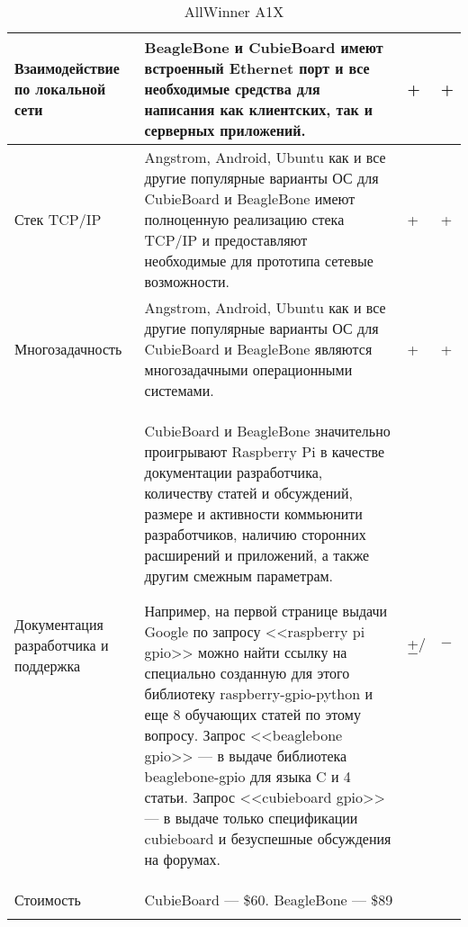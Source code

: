 \documentclass[twoside,a4paper]{msmb} %
\begin{document}
\begin{longtable}{| p{} | p{} | p{1cm} | p{1cm} |}
\hline
Взаимодействие по локальной сети &

BeagleBone и CubieBoard имеют встроенный Ethernet порт и все необходимые средства для написания как клиентских, так и серверных приложений.&

+ &

+\\

\hline
Стек TCP/IP &

Angstrom, Android, Ubuntu как и все другие популярные варианты ОС для CubieBoard и BeagleBone имеют полноценную реализацию стека TCP/IP и предоставляют необходимые для прототипа сетевые возможности. &

+ &

+\\

\hline
Многозадачность &

Angstrom, Android, Ubuntu как и все другие популярные варианты ОС для CubieBoard и BeagleBone являются многозадачными операционными системами. &

+ &

+\\

\hline 
Документация разработчика и поддержка & 

CubieBoard и BeagleBone значительно проигрывают Raspberry Pi в качестве документации разработчика, количеству статей и обсуждений, размере и активности коммьюнити разработчиков, наличию сторонних расширений и приложений, а также другим смежным параметрам.

Например, на первой странице выдачи Google по запросу <<raspberry pi gpio>> можно найти ссылку на специально созданную для этого библиотеку raspberry-gpio-python\cite{RPiGPIOPython} и еще 8 обучающих статей по этому вопросу. Запрос <<beaglebone gpio>> --- в выдаче библиотека beaglebone-gpio для языка C и 4 статьи.
Запрос <<cubieboard gpio>> --- в выдаче только спецификации cubieboard и безуспешные обсуждения на форумах. &

+/$-$ &

$-$\\

\hline

Стоимость &

CubieBoard --- \$60\cite{CubieBoardBuy}. BeagleBone --- \$89\cite{BeagleBoneBuy}

&&

\\

\hline
\caption{AllWinner A1X} %
\end{longtable}
\egroup
\end{document}
